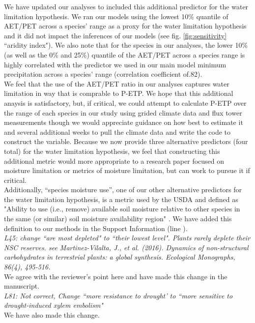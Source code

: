 \documentclass{article}[11pt]
\begin{document}
We have updated our analyses to included this additional predictor for the water limitation hypothesis. We ran our models using the lowest 10\% quantile of AET/PET across a species' range as a proxy for the water limitation hypothesis and it did not impact the inferences of our models (see fig. \ref{fig:sensitivity} ``aridity index"). We also note that for the species in our analyses, the lower 10\% (as well as the 0\% and 25\%) quantile of the AET/PET across a species range is highly correlated with the predictor we used in our main model minimum precipitation across a species' range (correlation coefficient of.82).\\

We feel that the use of the AET/PET ratio in our analyses captures water limitation in way that is comprable to P-ETP. We hope that this additional anaysis is satisfactory, but, if critical, we could attempt to calculate P-ETP over the range of each species in our study using grided climate data and flux tower measurements though we would appreciate guidance on how best to estimate it and several additional weeks to pull the climate data and write the code to construct the variable. Because we now provide three alternative predictors  (four total) for the water limitation hypothesis, we feel that constructing this additional metric would  more appropriate to a research paper focused on moisture limitation or metrics of moisture limitation, but can work to pursue it if critical.\\

Additionally, ``species moisture use'', one of our other alternative predictors for the water limitation hypothesis, is a metric used by the USDA and defined as "Ability to use (i.e., remove) available soil moisture relative to other species in the same (or similar) soil moisture availability region" \citep{usdancrs}. We have added this definition to our methods in the Support Information (line ).\\

\textit{L45: change ``are most depleted" to ``their lowest level". Plants rarely deplete their NSC reserves. see Martinez-Vilalta, J., et al. (2016). Dynamics of non-structural carbohydrates in terrestrial plants: a global synthesis. Ecological Monographs, 86(4), 495-516.}\\

We agree with the reviewer's point here and have made this change in the manuscript.\\


\textit{L81: Not correct, Change ``more resistance to drought' to ``more sensitive to drought-induced xylem embolism"}\\

We have also made this change.


\end{document}
